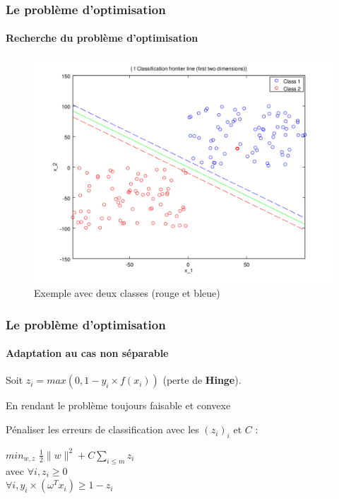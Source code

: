 \documentclass{beamer}
\begin{document}
\begin{frame}
\frametitle{Le problème d'optimisation}
\framesubtitle{Recherche du problème d'optimisation}

         \begin{figure}
         \centering
         \caption{Exemple avec deux classes (rouge et bleue)}
         \includegraphics[scale=0.4]{images/voronoi2.png}
         \end{figure}

\end{frame}

\begin{frame}
\frametitle{Le problème d'optimisation}
\framesubtitle{Adaptation au cas non séparable}

Soit $z_i = max(0, 1-y_i \times f(x_i))$ (perte de \textbf{Hinge}).

\pause

\bigskip

\begin{block}{En rendant le problème toujours faisable et convexe}

Pénaliser les erreurs de classification avec les $(z_i)_i$ et $C$ :

           \begin{center}
           $min_{w, z}$ $\frac{1}{2} \|w\|^2 + C \sum_{i \leq m}z_i$\\
           avec $\forall i, z_i \geq 0$\\
           $\forall i, y_i \times (\omega^{T} x_i) \geq 1 - z_i$\\
           \end{center}

\end{block}

\end{frame}
\end{document}
